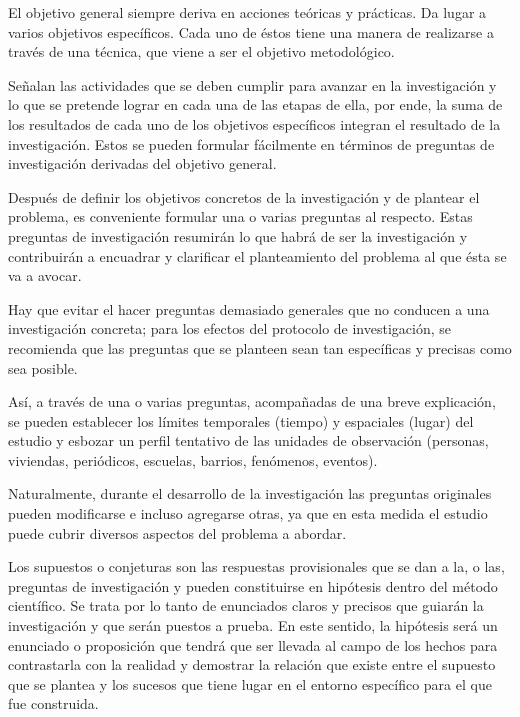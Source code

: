 \documentclass[10pt,a4paper]{protocol}
\begin{document}
El objetivo general siempre deriva en acciones teóricas y prácticas. Da lugar a varios objetivos específicos. Cada uno de éstos tiene una manera de realizarse a través de una técnica, que viene a ser el objetivo metodológico.

Señalan las actividades que se deben cumplir para avanzar en la investigación y lo que se pretende lograr en cada una de las etapas de ella, por ende, la suma de los resultados de cada uno de los objetivos específicos integran el resultado de la investigación. Estos se pueden formular fácilmente en términos de preguntas de investigación derivadas del objetivo general. 

Después de definir los objetivos concretos de la investigación y de plantear el problema, es conveniente formular una o varias preguntas al respecto. Estas preguntas de investigación resumirán lo que habrá de ser la investigación  y contribuirán a encuadrar y clarificar el planteamiento del problema al que ésta se va a avocar.\\ \vspace*{0.5cm}

Hay que evitar el hacer preguntas demasiado generales que no conducen a una investigación concreta; para los efectos del protocolo de investigación, se recomienda que las preguntas que se planteen sean tan específicas y precisas como sea posible.\\ \vspace*{0.5cm}

Así, a través de una o varias preguntas, acompañadas de una breve explicación, se pueden establecer los límites temporales (tiempo) y espaciales (lugar) del estudio y esbozar un perfil tentativo de las unidades de observación (personas, viviendas, periódicos, escuelas, barrios, fenómenos, eventos).\\ \vspace*{0.5cm}


Naturalmente, durante el desarrollo de la investigación las preguntas originales pueden modificarse e incluso agregarse otras, ya que en esta medida el estudio puede cubrir diversos aspectos del problema a abordar.\\ \vspace*{0.5cm}


Los supuestos o conjeturas son las respuestas provisionales que se dan a la, o las, preguntas de investigación y pueden constituirse en hipótesis dentro del método científico. Se trata por lo tanto de enunciados claros y precisos que guiarán la investigación y que serán puestos a prueba. En este sentido, la hipótesis será un enunciado o proposición que tendrá que ser llevada al campo de los hechos para contrastarla con la realidad y demostrar la relación que existe entre el supuesto que se plantea y los sucesos que tiene lugar en el entorno específico para el que fue construida.\\ \vspace*{0.5cm}
\end{document}
